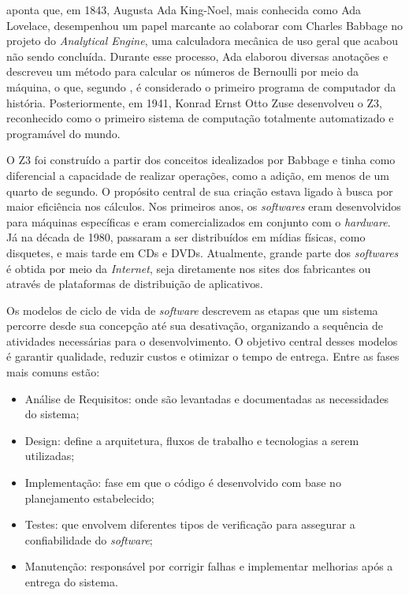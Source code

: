 \documentclass[english,brazilian]{UNISINOSartigo} %
\begin{document}
 aponta que, em 1843, Augusta Ada King-Noel, mais conhecida como Ada Lovelace, desempenhou um papel marcante ao colaborar com Charles Babbage no projeto do \textit{Analytical Engine}, uma calculadora mecânica de uso geral que acabou não sendo concluída. Durante esse processo, Ada elaborou diversas anotações e descreveu um método para calcular os números de Bernoulli por meio da máquina, o que, segundo , é considerado o primeiro programa de computador da história. Posteriormente, em 1941, Konrad Ernst Otto Zuse desenvolveu o Z3, reconhecido como o primeiro sistema de computação totalmente automatizado e programável do mundo.

O Z3 foi construído a partir dos conceitos idealizados por Babbage e tinha como diferencial a capacidade de realizar operações, como a adição, em menos de um quarto de segundo. O propósito central de sua criação estava ligado à busca por maior eficiência nos cálculos. Nos primeiros anos, os \textit{softwares} eram desenvolvidos para máquinas específicas e eram comercializados em conjunto com o \textit{hardware}. Já na década de 1980, passaram a ser distribuídos em mídias físicas, como disquetes, e mais tarde em CDs e DVDs. Atualmente, grande parte dos \textit{softwares} é obtida por meio da \textit{Internet}, seja diretamente nos sites dos fabricantes ou através de plataformas de distribuição de aplicativos.

Os modelos de ciclo de vida de \textit{software} descrevem as etapas que um sistema percorre desde sua concepção até sua desativação, organizando a sequência de atividades necessárias para o desenvolvimento. O objetivo central desses modelos é garantir qualidade, reduzir custos e otimizar o tempo de entrega. Entre as fases mais comuns estão:

\begin{itemize}[leftmargin=1cm, itemsep=0.1em, topsep=0.1em]
    \item Análise de Requisitos: onde são levantadas e documentadas as necessidades do sistema;
    \item Design: define a arquitetura, fluxos de trabalho e tecnologias a serem utilizadas;
    \item Implementação: fase em que o código é desenvolvido com base no planejamento estabelecido;
    \item Testes: que envolvem diferentes tipos de verificação para assegurar a confiabilidade do \textit{software};
    \item Manutenção: responsável por corrigir falhas e implementar melhorias após a entrega do sistema. 
\end{itemize}
\end{document}
